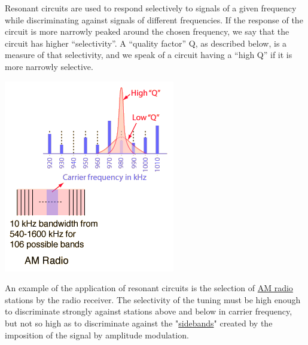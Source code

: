 Resonant circuits are used to respond selectively to signals of a given
frequency while discriminating against signals of different frequencies.
If the response of the circuit is more narrowly peaked around the chosen
frequency, we say that the circuit has higher ``selectivity''. A
``quality factor'' Q, as described below, is a measure of that
selectivity, and we speak of a circuit having a ``high Q'' if it is more
narrowly selective.

\includegraphics{./resonant-rlc-circuits_files/qamrad.png}\strut
An example of the application of resonant circuits is the selection of
\href{http://hyperphysics.phy-astr.gsu.edu/hbase/audio/radio.html\#c1}{AM
radio} stations by the radio receiver. The selectivity of the tuning
must be high enough to discriminate strongly against stations above and
below in carrier frequency, but not so high as to discriminate against
the
"\href{http://hyperphysics.phy-astr.gsu.edu/hbase/audio/sumdif.html\#c2}{sidebands}"
created by the imposition of the signal by amplitude modulation.\strut

